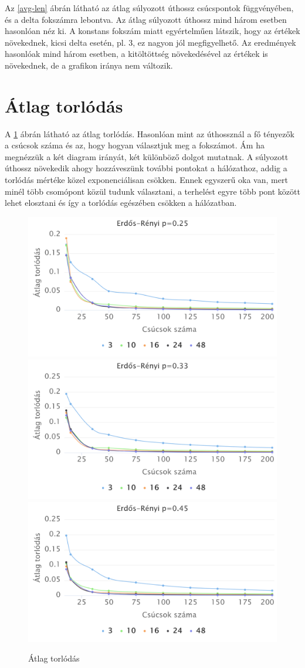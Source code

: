 \documentclass[12pt]{report}
\begin{document}
Az \ref{avg-len} ábrán látható az átlag súlyozott úthossz csúcspontok függvényében, és a delta fokszámra lebontva.
Az átlag súlyozott úthossz mind három esetben hasonlóan néz ki.
A konstans fokszám miatt egyértelműen látszik, hogy az értékek növekednek, kicsi delta esetén, pl. 3, ez nagyon jól megfigyelhető.
Az eredmények hasonlóak mind három esetben, a kitöltöttség növekedésével az értékek is növekednek, de a grafikon iránya nem változik.

\section{Átlag torlódás}

A \ref{congestion} ábrán látható az átlag torlódás. 
Hasonlóan mint az úthossznál a fő tényezők a csúcsok száma és az, hogy hogyan választjuk meg a fokszámot.
Ám ha megnézzük a két diagram irányát, két különböző dolgot mutatnak. 
A súlyozott úthossz növekedik ahogy hozzáveszünk további pontokat a hálózathoz, addig a torlódás mértéke közel exponenciálisan csökken.
Ennek egyszerű oka van, mert minél több csomópont közül tudunk választani, a terhelést egyre több pont között lehet elosztani és így a torlódás egészében csökken a hálózatban.

\begin{figure}[h]
	\begin{center}
		\includegraphics[width=0.40\linewidth]{pictures/constant_dan_ratio25_congestion.png}
		\includegraphics[width=0.40\linewidth]{pictures/constant_dan_ratio33_congestion.png}
		\includegraphics[width=0.40\linewidth]{pictures/constant_dan_ratio45_congestion.png}
		\caption{Átlag torlódás}
		\label{congestion}
	\end{center}
\end{figure}
\end{document}
